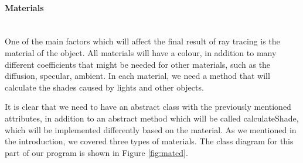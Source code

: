 \documentclass[a4paper]{article}
\newcommand{
	\subsubsubsection}[1]
{\paragraph{#1}\mbox{}\\[.35em]}
\begin{document}
	\subsubsubsection{Materials}
	One of the main factors which will affect the final result of ray tracing is the material of the object. All materials will have a colour, in addition to many different coefficients that might be needed for other materials, such as the diffusion, specular, ambient. In each material, we need a method that will calculate the shades caused by lights and other objects. \\
	\par It is clear that we need to have an abstract class with the previously mentioned attributes, in addition to an abstract method which will be called calculateShade, which will be implemented differently based on the material. As we mentioned in the introduction, we covered three types of materials. The class diagram for this part of our program is shown in Figure \ref{fig:matcd}.
\end{document}
